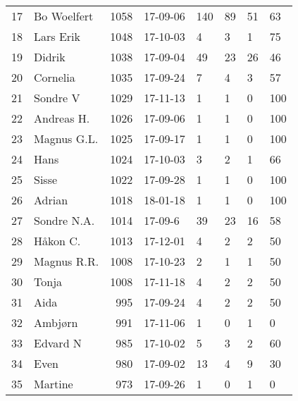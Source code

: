 \begin{longtable}{|r|l|r|l|l|l|l|l|}
17 &          Bo Woelfert &  1058 &    17-09-06 &             140 &    89 &      51 &        63 \\
18 &            Lars Erik &  1048 &    17-10-03 &               4 &     3 &       1 &        75 \\
19 &               Didrik &  1038 &    17-09-04 &              49 &    23 &      26 &        46 \\
20 &             Cornelia &  1035 &    17-09-24 &               7 &     4 &       3 &        57 \\
21 &             Sondre V &  1029 &    17-11-13 &               1 &     1 &       0 &       100 \\
22 &           Andreas H. &  1026 &    17-09-06 &               1 &     1 &       0 &       100 \\
23 &          Magnus G.L. &  1025 &    17-09-17 &               1 &     1 &       0 &       100 \\
24 &                 Hans &  1024 &    17-10-03 &               3 &     2 &       1 &        66 \\
25 &                Sisse &  1022 &    17-09-28 &               1 &     1 &       0 &       100 \\
26 &               Adrian &  1018 &    18-01-18 &               1 &     1 &       0 &       100 \\
27 &          Sondre N.A. &  1014 &     17-09-6 &              39 &    23 &      16 &        58 \\
28 &             Håkon C. &  1013 &    17-12-01 &               4 &     2 &       2 &        50 \\
29 &          Magnus R.R. &  1008 &    17-10-23 &               2 &     1 &       1 &        50 \\
30 &                Tonja &  1008 &    17-11-18 &               4 &     2 &       2 &        50 \\
31 &                 Aida &   995 &    17-09-24 &               4 &     2 &       2 &        50 \\
32 &              Ambjørn &   991 &    17-11-06 &               1 &     0 &       1 &         0 \\
33 &             Edvard N &   985 &    17-10-02 &               5 &     3 &       2 &        60 \\
34 &                 Even &   980 &    17-09-02 &              13 &     4 &       9 &        30 \\
35 &              Martine &   973 &    17-09-26 &               1 &     0 &       1 &         0 \\

\end{longtable}
